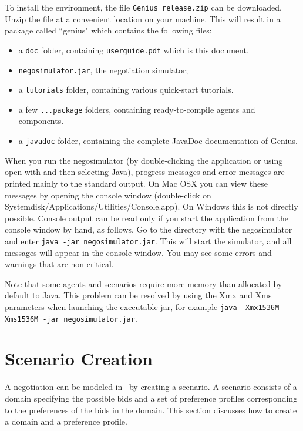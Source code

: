 \documentclass[]{article}
\begin{document}
To install the environment, the file \texttt{Genius\_release.zip} can be downloaded. Unzip the file at a convenient location on your machine. This will result in a package called ``genius" which contains the following files:

\begin{itemize}
	\item a \texttt{doc} folder, containing \texttt{userguide.pdf} which is this document.
	\item \texttt{negosimulator.jar}, the negotiation simulator;
	\item a \texttt{tutorials} folder, containing various quick-start tutorials.
	\item a few \texttt{...package} folders, containing ready-to-compile agents and components.
	\item  a \texttt{javadoc} folder, containing the complete JavaDoc documentation of Genius.
	
\end{itemize}

When you run the negosimulator (by double-clicking the application or using open with and then selecting Java), progress messages and error messages are printed mainly to the standard output. On Mac OSX you can view these messages by opening the console window (double-click on Systemdisk/Applications/Utilities/Console.app). On Windows this is not directly possible. Console output can be read only if you start the application from the console window by hand, as follows. Go to the directory with the negosimulator and enter
\texttt{java -jar negosimulator.jar}.
This will start the simulator, and all messages will appear in the console window. You may see some errors and warnings that are non-critical.

Note that some agents and scenarios require more memory than allocated by default to Java. This problem can be resolved by using the Xmx and Xms parameters when launching the executable jar, for example \texttt{java -Xmx1536M -Xms1536M -jar negosimulator.jar}.


\section{Scenario Creation}
A negotiation can be modeled in \Genius~by creating a scenario. A scenario consists of a domain specifying the possible bids and a set of preference profiles corresponding to the preferences of the bids in the domain. This section discusses how to create a domain and a preference profile.
\end{document}
